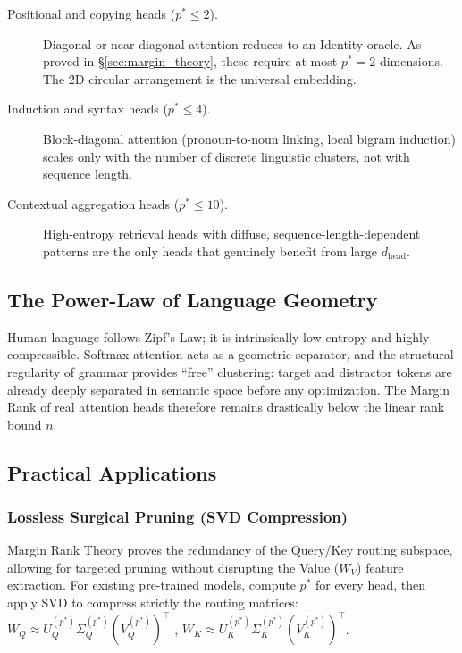\begin{description}
  \item[Positional and copying heads ($p^* \leq 2$).] Diagonal or near-diagonal attention
        reduces to an Identity oracle. As proved in \S\ref{sec:margin_theory}, these require
        at most $p^* = 2$ dimensions. The 2D circular arrangement is the universal embedding.
  \item[Induction and syntax heads ($p^* \leq 4$).] Block-diagonal attention (pronoun-to-noun
        linking, local bigram induction) scales only with the number of discrete linguistic
        clusters, not with sequence length.
  \item[Contextual aggregation heads ($p^* \leq 10$).] High-entropy retrieval heads with
        diffuse, sequence-length-dependent patterns are the only heads that genuinely benefit
        from large $d_{\text{head}}$.
\end{description}

\subsection{The Power-Law of Language Geometry}

Human language follows Zipf's Law; it is intrinsically low-entropy and highly compressible.
Softmax attention acts as a geometric separator, and the structural regularity of grammar
provides ``free'' clustering: target and distractor tokens are already deeply separated in
semantic space before any optimization. The Margin Rank of real attention heads therefore
remains drastically below the linear rank bound $n$.

\subsection{Practical Applications}

\subsubsection{Lossless Surgical Pruning (SVD Compression)}
Margin Rank Theory proves the redundancy of the Query/Key routing subspace, allowing for targeted pruning without disrupting the Value ($W_V$) feature extraction. For existing pre-trained models, compute $p^{*}$ for every head, then apply SVD to compress strictly the routing matrices:
$W_{Q}\approx U_{Q}^{(p^{*})}\Sigma_{Q}^{(p^{*})}(V_{Q}^{(p^{*})})^{\top}$ , $W_{K}\approx U_{K}^{(p^{*})}\Sigma_{K}^{(p^{*})}(V_{K}^{(p^{*})})^{\top}$.

